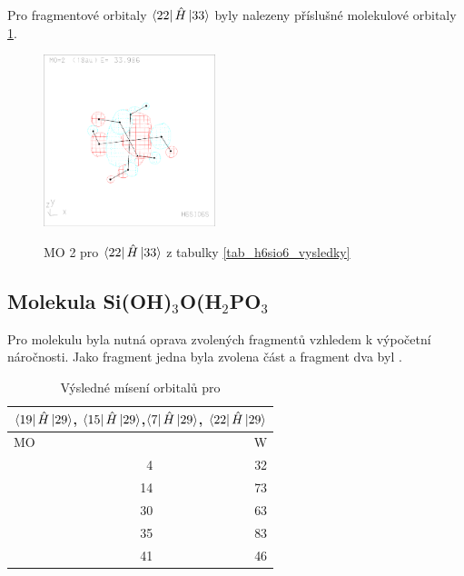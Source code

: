 \documentclass[
  digital, %
  table,   %
  lof,     %
  lot,     %
]{fithesis3}
\begin{document}
Pro fragmentové orbitaly $\bra{22}{\hat{H}}\ket{33}$ byly nalezeny příslušné molekulové orbitaly \ref{obr_h6sio6_MO_s3_2}.
  
  \begin{figure}[h]
\caption{MO 2 pro $\bra{22}{\hat{H}}\ket{33}$  z tabulky \ref{tab_h6sio6_vysledky}}
  \center
  \includegraphics[width=5cm]{h6sio6_obrazky/s3_2.eps}
  \label{obr_h6sio6_MO_s3_2}
  \end{figure}
 \subsection{Molekula Si(OH)$_3$O(H$_2$PO$_3$}
 Pro molekulu  byla nutná oprava zvolených fragmentů vzhledem k výpočetní náročnosti. Jako fragment jedna byla zvolena část  a fragment dva byl .  

\begin{table}[htbp]
\caption{Výsledné mísení orbitalů pro }
\begin{center}
\begin{tabular}{|r|r|}
\hline
\multicolumn{2}{|c|}{$\bra{19}{\hat{H}}\ket{29}$, $\bra{15}{\hat{H}}\ket{29}$,$\bra{7}{\hat{H}}\ket{29}$, $\bra{22}{\hat{H}}\ket{29}$} \\
\hline \hline
\multicolumn{1}{|l|}{MO} & \multicolumn{1}{r|}{W} \\ \hline
4 & 32 \\ \hline
14 & 73 \\ \hline
30 & 63 \\ \hline
35 & 83 \\ \hline
41 & 46 \\ \hline
\end{tabular}
\end{center}
\label{tab_sio3_vysledky}
\end{table}
\end{document}
